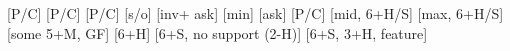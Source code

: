 \begin{bidsemi}
[P/C]
[P/C]
[P/C]
[s/o]
[inv+ ask]
    [min]
        [ask]
        [P/C]
    [mid, 6+H/S]
    [max, 6+H/S]
[some 5+M, GF]
    [6+H]
    [6+S, no support (2-H)]
    [6+S, 3+H, feature]
\end{bidsemi}